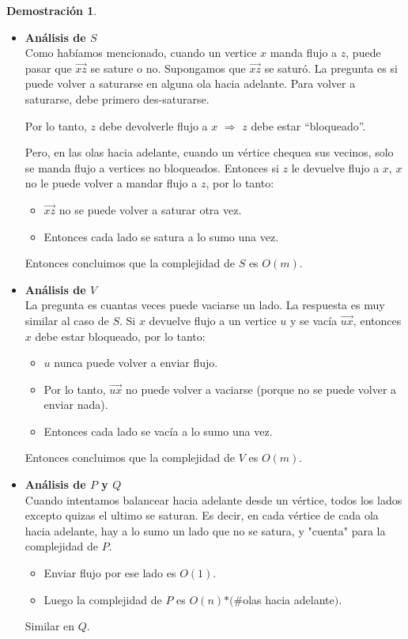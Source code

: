 \documentclass[11pt, a4paper]{article}
\theoremstyle{definition}
\newtheorem*{demostracion}{Demostración}
\begin{document}
\begin{demostracion}
    \begin{itemize}
        \item \textbf{Análisis de $S$}\\
        Como habíamos mencionado, cuando un vertice $x$ manda flujo a $z$, puede pasar que $\overrightarrow{xz}$ se sature o no. Supongamos que 
        $\overrightarrow{xz}$ se saturó. La pregunta es si puede volver a saturarse en alguna ola hacia adelante. Para volver a saturarse, debe primero
        des-saturarse.
        \begin{center}
            Por lo tanto, $z$ debe devolverle flujo a $x$ $\Rightarrow$ $z$ debe estar “bloqueado”.
        \end{center} 
        Pero, en las olas hacia adelante, cuando un vértice chequea sus vecinos, solo se manda flujo a vertices no bloqueados. Entonces si $z$ le 
        devuelve flujo a $x$, $x$ no le puede volver a mandar flujo a $z$, por lo tanto:
        \begin{itemize}
            \item $\overrightarrow{xz}$ no se puede volver a saturar otra vez.
            \item Entonces cada lado se satura a lo sumo una vez.
        \end{itemize}
        Entonces concluimos que la complejidad de $S$ es $O(m)$.
        \item \textbf{Análisis de $V$}\\
        La pregunta es cuantas veces puede vaciarse un lado. La respuesta es muy similar al caso de $S$. 
        Si $x$ devuelve flujo a un vertice $u$ y se vacía $\overrightarrow{ux}$, entonces $x$ debe estar bloqueado, por lo tanto:
        \begin{itemize}
            \item $u$ nunca puede volver a enviar flujo.
            \item Por lo tanto, $\overrightarrow{ux}$ no puede volver a vaciarse (porque no se puede volver a enviar nada).
            \item Entonces cada lado se vacía a lo sumo una vez.
        \end{itemize}
        Entonces concluimos que la complejidad de $V$ es $O(m)$.
        \item \textbf{Análisis de $P$ y $Q$}\\
        Cuando intentamos balancear hacia adelante desde un vértice,
        todos los lados excepto quizas el ultimo se saturan. Es decir, en cada vértice de
        cada ola hacia adelante, hay a lo sumo un lado que no se satura, y "cuenta" para la
        complejidad de $P$. 
        \begin{itemize}
            \item Enviar flujo por ese lado es $O(1)$. 
            \item Luego la complejidad de $P$ es $O(n)$$*$$(\#$olas hacia adelante$)$.
        \end{itemize}
        Similar en $Q$.


\end{itemize}
\end{demostracion}
\end{document}
